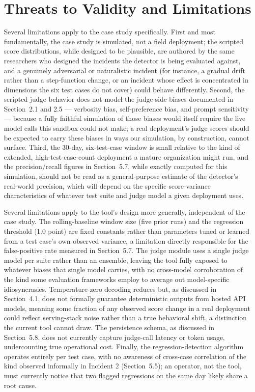 \documentclass[11pt,a4paper]{article}
\begin{document}
\section{Threats to Validity and Limitations}

Several limitations apply to the case study specifically. First and most
fundamentally, the case study is simulated, not a field deployment; the
scripted score distributions, while designed to be plausible, are
authored by the same researchers who designed the incidents the detector
is being evaluated against, and a genuinely adversarial or naturalistic
incident (for instance, a gradual drift rather than a step-function
change, or an incident whose effect is concentrated in dimensions the
six test cases do not cover) could behave differently. Second, the
scripted judge behavior does not model the judge-side biases documented
in Section~2.1 and 2.5 --- verbosity bias, self-preference bias, and
prompt sensitivity --- because a fully faithful simulation of those
biases would itself require the live model calls this sandbox could not
make; a real deployment's judge scores should be
expected to carry these biases in ways our simulation, by construction,
cannot surface. Third, the 30-day, six-test-case window is small
relative to the kind of extended, high-test-case-count deployment a
mature organization might run, and the precision/recall figures in
Section~5.7, while exactly computed for this simulation, should not be
read as a general-purpose estimate of the detector's
real-world precision, which will depend on the specific score-variance
characteristics of whatever test suite and judge model a given
deployment uses.

Several limitations apply to the tool's design more
generally, independent of the case study. The rolling-baseline window
size (five prior runs) and the regression threshold (1.0 point) are
fixed constants rather than parameters tuned or learned from a test
case's own observed variance, a limitation directly
responsible for the false-positive rate measured in Section~5.7. The
judge module uses a single judge model per suite rather than an
ensemble, leaving the tool fully exposed to whatever biases that single
model carries, with no cross-model corroboration of the kind some
evaluation frameworks employ to average out model-specific
idiosyncrasies. Temperature-zero decoding reduces but, as discussed in
Section~4.1, does not formally guarantee deterministic outputs from
hosted API models, meaning some fraction of any observed score change in
a real deployment could reflect serving-stack noise rather than a true
behavioral shift, a distinction the current tool cannot draw. The
persistence schema, as discussed in Section~5.8, does not currently
capture judge-call latency or token usage, undercounting true
operational cost. Finally, the regression-detection algorithm operates
entirely per test case, with no awareness of cross-case correlation of
the kind observed informally in Incident 2 (Section~5.5); an operator,
not the tool, must currently notice that two flagged regressions on the
same day likely share a root cause.
\end{document}
